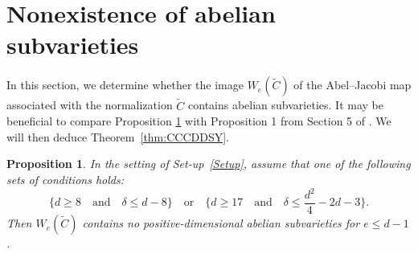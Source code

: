 \documentclass[fontsize=11pt,reqno]{amsart}
\newtheorem{proposition}[thm]{Proposition}
\theoremstyle{definition}
\theoremstyle{remark}
\newcommand{\tC}{\widetilde{C}}
\begin{document}
\section{Nonexistence of abelian subvarieties}\label{Section:MainProof}

In this section, we determine whether the image $W_e(\tC)$ of the Abel--Jacobi map associated with the normalization $\tC$ contains abelian subvarieties. It may be beneficial to compare Proposition \ref{prop:CCCDDSY.AbelianVarieties} with Proposition 1 from Section 5 of \cite{DK94}. We will then deduce Theorem~\ref{thm:CCCDDSY}.

\begin{proposition}\label{prop:CCCDDSY.AbelianVarieties}
    In the setting of Set-up~\ref{Setup}, assume that one of the following sets of conditions holds:
    \[ \{ d \geq 8 \quad \text{and} \quad \delta \leq d-8 \} \quad \text{or} \quad \{ d \geq 17 \quad \text{and} \quad \delta \leq \frac{d^{2}}{4} - 2d - 3 \}. \]
    Then $W_{e}(\tC)$ contains no positive-dimensional abelian subvarieties for $e\leq d-1$.
\end{proposition}
\end{document}

